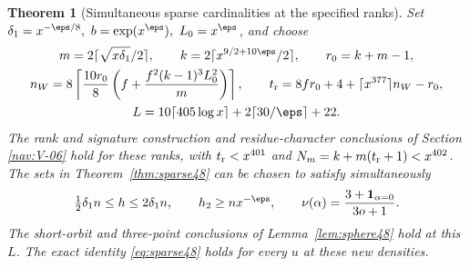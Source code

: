 \documentclass[a4paper,11pt]{article}
\newtheorem{theorem}[proposition]{Theorem}
\theoremstyle{definition}
\theoremstyle{remark}
\numberwithin{equation}{section}
\begin{document}
\begin{theorem}[Simultaneous sparse cardinalities at the specified ranks]\label{thm:rangenew50}
Set \(\delta_1=x^{-\eps/8},\ b=\exp(x^\eps),\ L_0=x^\eps\), and choose
\[
 \begin{gathered}
 m=2\lceil\sqrt{x\delta_1}/2\rceil,\qquad
 k=2\lceil x^{9/2+10\eps}/2\rceil,\qquad r_0=k+m-1,\\
 n_W=8\left\lceil\frac{10 r_0}{8}
                  \left(f+\frac{f^2(k-1)^3L_0^2}{m}\right)\right\rceil,
 \qquad
 t_{\rm r}=8fr_0+4+\lceil x^{377}\rceil n_W-r_0,\\
 L=10\lceil405\log x\rceil+2\lceil30/\eps\rceil+22 .
 \end{gathered}
\]
The rank and signature construction and residue-character conclusions
of Section \ref{nav:V-06}
hold for these ranks, with \(t_{\rm r}<x^{401}\) and
\(N_m=k+m(t_{\rm r}+1)<x^{402}\). The sets in
Theorem~\ref{thm:sparse48} can be chosen to satisfy simultaneously
\[
 \tfrac12\delta_1 n\le h\le2\delta_1 n,\qquad
 h_2\ge n x^{-\eps},\qquad
 \nu(\alpha)=\frac{3+\mathbf1_{\alpha=0}}{3o+1}.
\]
The short-orbit and three-point conclusions of Lemma~\ref{lem:sphere48}
hold at this \(L\). The exact identity \eqref{eq:sparse48} holds for
every \(u\) at these new densities.
\end{theorem}
\end{document}
